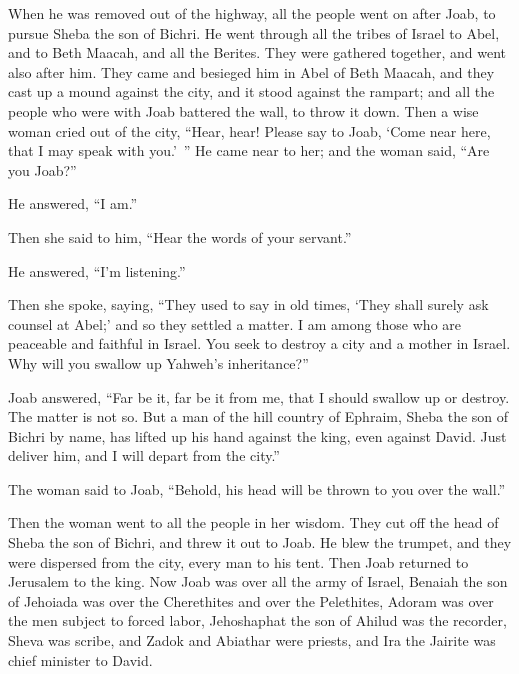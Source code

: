 {When he was removed out of the highway, all the people went on after Joab, to pursue Sheba the son of Bichri.
He went through all the tribes of Israel to Abel, and to Beth Maacah, and all the Berites. They were gathered together, and went also after him.
They came and besieged him in Abel of Beth Maacah, and they cast up a mound against the city, and it stood against the rampart; and all the people who were with Joab battered the wall, to throw it down.
Then a wise woman cried out of the city, “Hear, hear! Please say to Joab, ‘Come near here, that I may speak with you.’ ”
He came near to her; and the woman said, “Are you Joab?”
\par }{\PP He answered, “I am.”
\par }{\PP Then she said to him, “Hear the words of your servant.”
\par }{\PP He answered, “I’m listening.”
\par }{\PP {}Then she spoke, saying, “They used to say in old times, ‘They shall surely ask counsel at Abel;’ and so they settled a matter.
I am among those who are peaceable and faithful in Israel. You seek to destroy a city and a mother in Israel. Why will you swallow up Yahweh’s inheritance?”
\par }{\PP {}Joab answered, “Far be it, far be it from me, that I should swallow up or destroy.
The matter is not so. But a man of the hill country of Ephraim, Sheba the son of Bichri by name, has lifted up his hand against the king, even against David. Just deliver him, and I will depart from the city.”
\par }{\PP The woman said to Joab, “Behold, his head will be thrown to you over the wall.”
\par }{\PP {}Then the woman went to all the people in her wisdom. They cut off the head of Sheba the son of Bichri, and threw it out to Joab. He blew the trumpet, and they were dispersed from the city, every man to his tent. Then Joab returned to Jerusalem to the king.
Now Joab was over all the army of Israel, Benaiah the son of Jehoiada was over the Cherethites and over the Pelethites,
Adoram was over the men subject to forced labor, Jehoshaphat the son of Ahilud was the recorder,
Sheva was scribe, and Zadok and Abiathar were priests,
and Ira the Jairite was chief minister to David.

}
